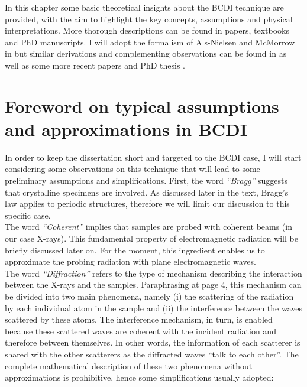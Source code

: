 
In this chapter some basic theoretical insights about the BCDI technique are provided, with the aim to highlight the key 
concepts, assumptions and physical interpretations. More thorough descriptions can be found in papers, textbooks 
and PhD manuscripts. I will adopt the formalism of Als-Nielsen and McMorrow in \cite{alsnielsen_mcmorrow2011} but similar 
derivations and complementing observations can be found in \cite{guinier1994, paganin2006coherent} as well as some more recent papers \cite{vartanyants2013coherentxraydiffractionimaging} 
and PhD thesis \cite{dupraz:tel-01285735, girard:tel-02906931, Atlan2023}. 

\section{Foreword on typical assumptions and approximations in BCDI}
In order to keep the dissertation short and targeted to the BCDI case, I will start considering some observations on this
technique that will lead to some preliminary assumptions and simplifications. First, the word \textit{``Bragg''} suggests that 
crystalline specimens are involved. As discussed later in the text, Bragg's law applies to periodic structures, therefore 
we will limit our discussion to this specific case. \\
The word \textit{``Coherent''} implies that samples are probed with coherent beams (in our case X-rays). This fundamental property of 
electromagnetic radiation will be briefly discussed later on. For the moment, this ingredient enables us to approximate the 
probing radiation with plane electromagnetic waves. \\
The word \textit{``Diffraction''} refers to the type of mechanism describing the interaction between the X-rays and the 
samples. Paraphrasing \cite{guinier1994} at page 4, this mechanism can be divided into two main phenomena, namely (i) 
the scattering of the radiation by each individual atom in the sample and (ii) the interference between the waves scattered 
by these atoms. The interference mechanism, in turn, is enabled because these scattered waves are coherent with the incident 
radiation and therefore between themselves. In other words, the information of each scatterer is shared with the other scatterers 
as the diffracted waves ``talk to each other''. The complete mathematical description of these two phenomena without approximations 
is prohibitive, hence some simplifications usually adopted: 
